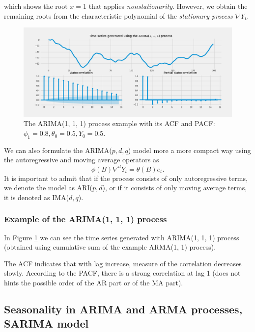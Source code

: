 which shows the root $x = 1$ that applies \textit{nonstationarity}. However, we obtain the remaining roots from the characteristic polynomial of the \textit{stationary process $\nabla Y_t$}. 

\begin{figure}[!ht]
\centering
\includegraphics[width=1\textwidth, height=0.5\textwidth]{figures/chapter_03/arima_1_1_1.png}
\caption{The ARIMA(1, 1, 1) process example with its ACF and PACF: $\phi_1 = 0.8, \theta_0 = 0.5, Y_0 = 0.5$.}
\label{fig:arima_1_1_1_example}
\end{figure}

We can also formulate the ARIMA($p, d, q$) model more a more compact way using the autoregressive and moving average operators as \begin{equation}
    \phi(B)\nabla^{d}Y_t = \theta(B)e_t.
\end{equation} It is important to admit that if the process consists of only autoregressive terms, we denote the model as ARI($p, d$), or if it consists of only moving average terms, it is denoted as IMA($d, q$).

\subsubsection{Example of the ARIMA(1, 1, 1) process}

In Figure \ref{fig:arima_1_1_1_example} we can see the time series generated with ARIMA(1, 1, 1) process (obtained using cumulative sum of the example ARMA(1, 1) process). 

The ACF indicates that with lag increase, measure of the correlation decreases slowly. According to the PACF, there is a strong correlation  at lag 1 (does not hints the possible order of the AR part or of the MA part).

\subsection{Seasonality in ARIMA and ARMA processes, SARIMA model}

